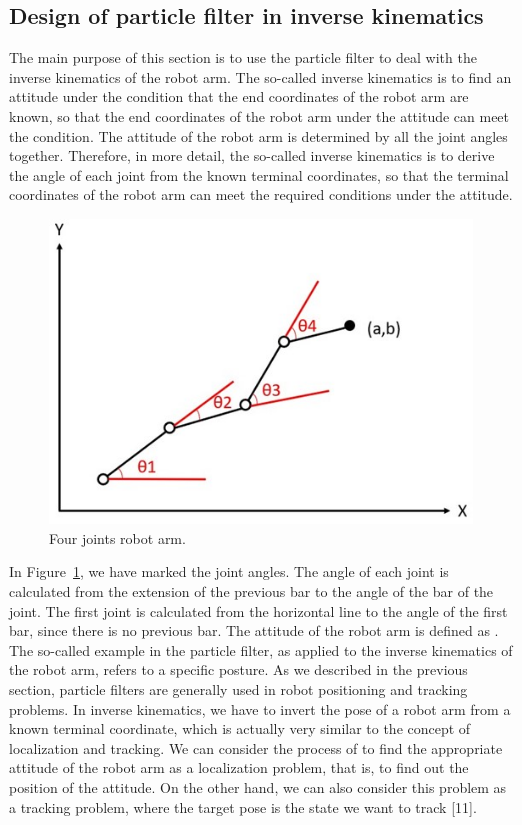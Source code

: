 \documentclass[journal,article,submit,pdftex,moreauthors]{Definitions/mdpi}
\begin{document}
\subsection{Design of particle filter in inverse kinematics}
The main purpose of this section is to use the particle filter to deal with the inverse kinematics of the robot arm. The so-called inverse kinematics is to find an attitude under the condition that the end coordinates of the robot arm are known, so that the end coordinates of the robot arm under the attitude can meet the condition. The attitude of the robot arm is determined by all the joint angles together. Therefore, in more detail, the so-called inverse kinematics is to derive the angle of each joint from the known terminal coordinates, so that the terminal coordinates of the robot arm can meet the required conditions under the attitude.

\begin{figure}[H]
\includegraphics[width=10.5 cm]{Definitions/fig2}
\caption{Four joints robot arm.\label{fig2}}
\end{figure}   

In Figure~\ref{fig2}, we have marked the joint angles. The angle of each joint is calculated from the extension of the previous bar to the angle of the bar of the joint. The first joint is calculated from the horizontal line to the angle of the first bar, since there is no previous bar. The attitude of the robot arm is defined as  . The so-called example in the particle filter, as applied to the inverse kinematics of the robot arm, refers to a specific posture. As we described in the previous section, particle filters are generally used in robot positioning and tracking problems. In inverse kinematics, we have to invert the pose of a robot arm from a known terminal coordinate, which is actually very similar to the concept of localization and tracking. We can consider the process of to find the appropriate attitude of the robot arm as a localization problem, that is, to find out the position of the attitude. On the other hand, we can also consider this problem as a tracking problem, where the target pose is the state we want to track [11].
\end{document}
